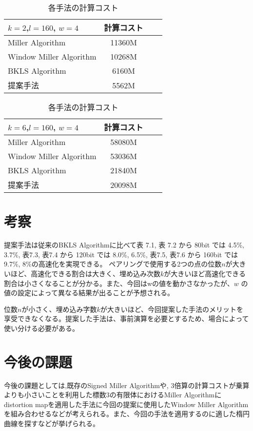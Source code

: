 \begin{table}[htbp]
 \begin{center}
  \begin{tabular}{|l|c|c|c|}
  \hline
  $k=2$,$l=160$, $w=4$ & 計算コスト \\
  \hline
  Miller Algorithm & 11360M \\
  \hline
  Window Miller Algorithm & 10268M \\
  \hline
  BKLS Algorithm &  6160M \\
  \hline
  提案手法 & 5562M \\
  \hline
  \end{tabular}
 \end{center}
 \caption{各手法の計算コスト}
\end{table}

\begin{table}[htbp]
 \begin{center}
  \begin{tabular}{|l|c|c|c|}
  \hline
  $k=6$,$l=160$, $w=4$ & 計算コスト \\
  \hline
  Miller Algorithm & 58080M \\
  \hline
  Window Miller Algorithm & 53036M \\
  \hline
  BKLS Algorithm &  21840M \\
  \hline
  提案手法 & 20098M \\
  \hline
  \end{tabular}
 \end{center}
 \caption{各手法の計算コスト}
\end{table}

\par
\par
\section{考察}

提案手法は従来のBKLS Algorithmに比べて表 7.1, 表 7.2 から 80bit では 4.5\%, 3.7\%, 表7.3, 表7.4 から 120bit では 8.0\%, 6.5\%, 表7.5, 表7.6 から 160bit では 9.7\%, 8\%の高速化を実現できる。
ペアリングで使用する2つの点の位数$n$が大きいほど、高速化できる割合は大きく、埋め込み次数$k$が大きいほど高速化できる割合は小さくなることが分かる。また、今回はwの値を動かさなかったが、$w$ の値の設定によって異なる結果が出ることが予想される。
\par
位数$n$が小さく、埋め込み字数$k$が大きいほど、今回提案した手法のメリットを享受できなくなる。提案した手法は、事前演算を必要とするため、場合によって使い分ける必要がある。

\section{今後の課題}
今後の課題としては,既存のSigned Miller Algorithmや, 3倍算の計算コストが乗算よりも小さいことを利用した標数3の有限体におけるMiller Algorithmにdistortion mapを適用した手法に今回の提案に使用したWindow Miller Algorithmを組み合わせるなどが考えられる。また、今回の手法を適用するのに適した楕円曲線を探すなどが挙げられる。
